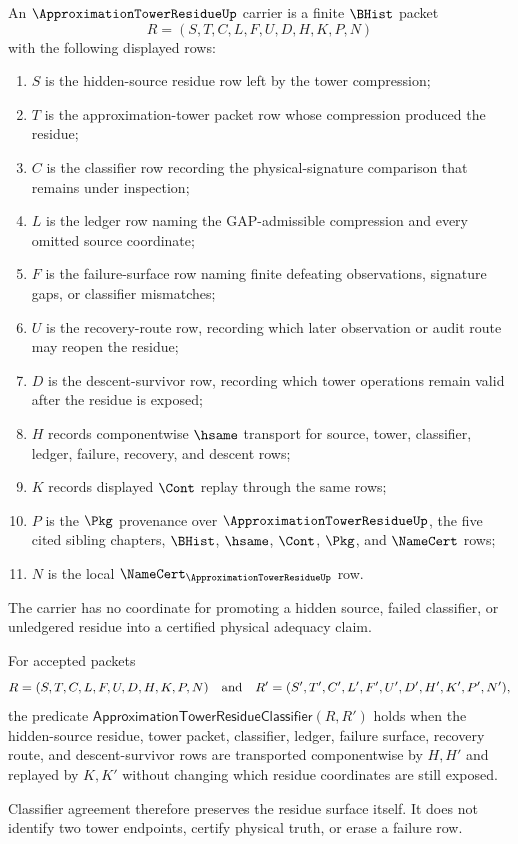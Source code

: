 \begin{definition}
\label{def:approximation-tower-residue-carrier}
An $\ApproximationTowerResidueUp$ carrier is a finite $\BHist$ packet
$$
R=(S,T,C,L,F,U,D,H,K,P,N)
$$
with the following displayed rows:
\begin{enumerate}
\item $S$ is the hidden-source residue row left by the tower compression;
\item $T$ is the approximation-tower packet row whose compression produced the residue;
\item $C$ is the classifier row recording the physical-signature comparison that remains under inspection;
\item $L$ is the ledger row naming the GAP-admissible compression and every omitted source coordinate;
\item $F$ is the failure-surface row naming finite defeating observations, signature gaps, or classifier mismatches;
\item $U$ is the recovery-route row, recording which later observation or audit route may reopen the residue;
\item $D$ is the descent-survivor row, recording which tower operations remain valid after the residue is exposed;
\item $H$ records componentwise $\hsame$ transport for source, tower, classifier, ledger, failure, recovery, and descent rows;
\item $K$ records displayed $\Cont$ replay through the same rows;
\item $P$ is the $\Pkg$ provenance over $\ApproximationTowerResidueUp$, the five cited sibling chapters, $\BHist$, $\hsame$, $\Cont$, $\Pkg$, and $\NameCert$ rows;
\item $N$ is the local $\NameCert_{\ApproximationTowerResidueUp}$ row.
\end{enumerate}
The carrier has no coordinate for promoting a hidden source, failed classifier, or unledgered residue into a certified physical adequacy claim.
\end{definition}

\begin{definition}
\label{def:approximation-tower-residue-classifier}
For accepted packets
$$
R=(S,T,C,L,F,U,D,H,K,P,N)
\quad\hbox{and}\quad
R'=(S',T',C',L',F',U',D',H',K',P',N'),
$$
the predicate $\mathsf{ApproximationTowerResidueClassifier}(R,R')$ holds when the hidden-source residue, tower packet, classifier, ledger, failure surface, recovery route, and descent-survivor rows are transported componentwise by $H,H'$ and replayed by $K,K'$ without changing which residue coordinates are still exposed.

Classifier agreement therefore preserves the residue surface itself. It does not identify two tower endpoints, certify physical truth, or erase a failure row.
\end{definition}

